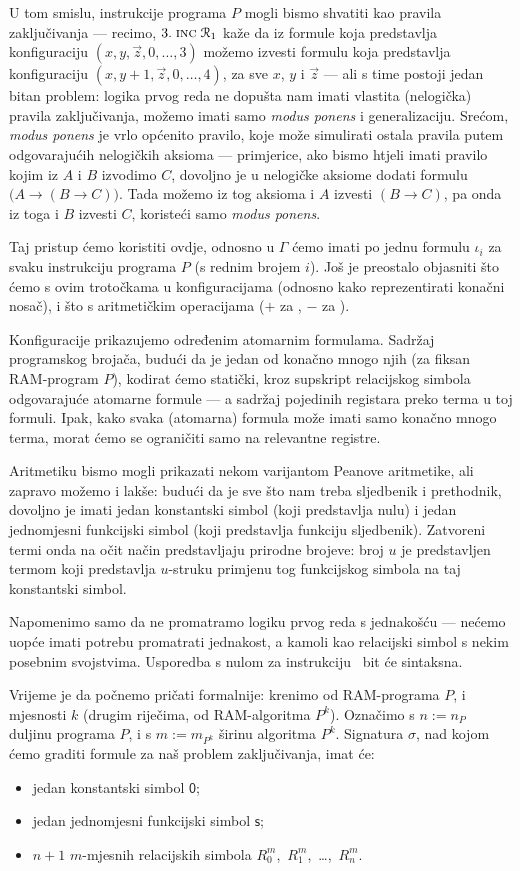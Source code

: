 U tom smislu, instrukcije programa $P$ mogli bismo shvatiti kao pravila zaključivanja --- recimo, $3.\;\textsc{inc}\;\mathcal R_{1}$ kaže da iz formule koja predstavlja konfiguraciju $(x,y,\vec z,0,\dotsc,3)$ možemo izvesti formulu koja predstavlja konfiguraciju $(x,y+1,\vec z,0,\dotsc,4)$, za sve $x$, $y$ i $\vec z$ --- ali s time postoji jedan bitan problem: logika prvog reda ne dopušta nam imati vlastita (nelogička) pravila zaključivanja, možemo imati samo \emph{modus ponens} i generalizaciju. Srećom, \emph{modus ponens} je vrlo općenito pravilo, koje može simulirati ostala pravila putem odgovarajućih nelogičkih aksioma --- primjerice, ako bismo htjeli imati pravilo kojim iz $A$ i $B$ izvodimo $C$, dovoljno je u nelogičke aksiome dodati formulu $\bigl(A\to(B\to C)\bigr)$. Tada možemo iz tog aksioma i $A$ izvesti $(B\to C)$, pa onda iz toga i $B$ izvesti $C$, koristeći samo \emph{modus ponens}.

Taj pristup ćemo koristiti ovdje, odnosno u $\Gamma$ ćemo imati po jednu formulu $\iota_i$ za svaku instrukciju programa $P$ (s rednim brojem $i$). Još je preostalo objasniti što ćemo s ovim trotočkama u konfiguracijama (odnosno kako reprezentirati konačni nosač), i što s aritmetičkim operacijama ($+$ za \inc, $-$ za \dec).

Konfiguracije prikazujemo određenim atomarnim formulama. Sadržaj programskog brojača, budući da je jedan od konačno mnogo njih (za fiksan RAM-program $P$), kodirat ćemo statički, kroz supskript relacijskog simbola odgovarajuće atomarne formule --- a sadržaj pojedinih registara preko terma u toj formuli. Ipak, kako svaka (atomarna) formula može imati samo konačno mnogo terma, morat ćemo se ograničiti samo na relevantne registre.

Aritmetiku bismo mogli prikazati nekom 
varijantom Peanove aritmetike, ali zapravo možemo i lakše: budući da je sve što nam treba sljedbenik i prethodnik, dovoljno je imati jedan konstantski simbol (koji predstavlja nulu) i jedan jednomjesni funkcijski simbol (koji predstavlja funkciju sljedbenik). Zatvoreni termi onda na očit način predstavljaju prirodne brojeve: broj $u$ je predstavljen termom koji predstavlja $u$-struku primjenu tog funkcijskog simbola na taj konstantski simbol.

Napomenimo samo da ne promatramo logiku prvog reda s jednakošću --- nećemo uopće imati potrebu promatrati jednakost, a kamoli kao relacijski simbol s nekim posebnim svojstvima. Usporedba s nulom za instrukciju \dec\ bit će sintaksna.

Vrijeme je da počnemo pričati formalnije: krenimo od RAM-programa $P$, i mjesnosti $k$ (drugim riječima, od RAM-algoritma $P^k$). Označimo s $n:=n_P$ duljinu programa $P$, i s $m:=m_{P^k}$ širinu algoritma $P^k$. Signatura $\sigma$, nad kojom ćemo graditi formule za naš problem zaključivanja, imat će:
\begin{itemize}
    \item jedan konstantski simbol $\mathsf 0$;
    \item jedan jednomjesni funkcijski simbol $\mathsf s$;
    \item $n+1$ $m$-mjesnih relacijskih simbola $R_0^m$,~$R_1^m$,~\ldots,~$R_n^m$.
\end{itemize}

